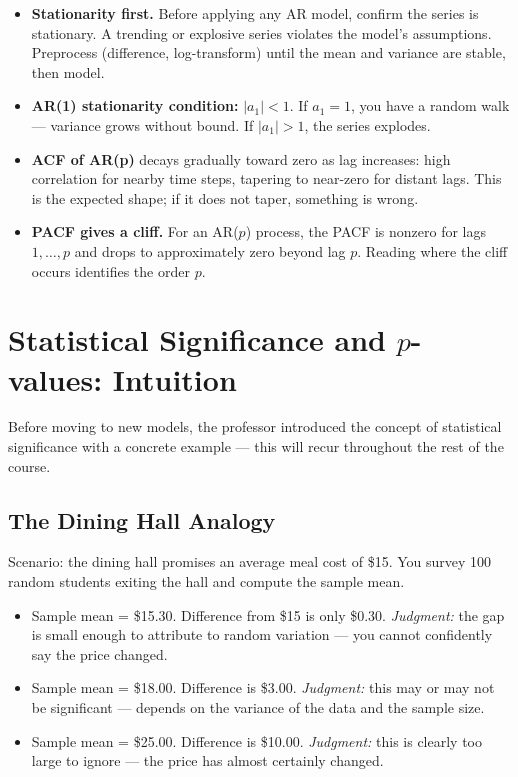 \documentclass[11pt]{article}
\begin{document}
\begin{itemize}
    \item \textbf{Stationarity first.} Before applying any AR model, confirm
      the series is stationary. A trending or explosive series violates the
      model's assumptions. Preprocess (difference, log-transform) until the
      mean and variance are stable, then model.
    \item \textbf{AR(1) stationarity condition:} $|a_1| < 1$. If $a_1 = 1$,
      you have a random walk --- variance grows without bound. If $|a_1| > 1$,
      the series explodes.
    \item \textbf{ACF of AR(p)} decays gradually toward zero as lag increases:
      high correlation for nearby time steps, tapering to near-zero for distant
      lags. This is the expected shape; if it does not taper, something is wrong.
    \item \textbf{PACF gives a cliff.} For an AR($p$) process, the PACF is
      nonzero for lags $1, \ldots, p$ and drops to approximately zero beyond
      lag $p$. Reading where the cliff occurs identifies the order $p$.
\end{itemize}


\section{Statistical Significance and $p$-values: Intuition}

Before moving to new models, the professor introduced the concept of
statistical significance with a concrete example --- this will recur throughout
the rest of the course.

\subsection{The Dining Hall Analogy}
Scenario: the dining hall promises an average meal cost of \$15.
You survey 100 random students exiting the hall and compute the sample mean.

\begin{itemize}
    \item Sample mean = \$15.30. Difference from \$15 is only \$0.30.
      \textit{Judgment:} the gap is small enough to attribute to random
      variation --- you cannot confidently say the price changed.
    \item Sample mean = \$18.00. Difference is \$3.00.
      \textit{Judgment:} this may or may not be significant --- depends on
      the variance of the data and the sample size.
    \item Sample mean = \$25.00. Difference is \$10.00.
      \textit{Judgment:} this is clearly too large to ignore --- the price
      has almost certainly changed.
\end{itemize}
\end{document}
